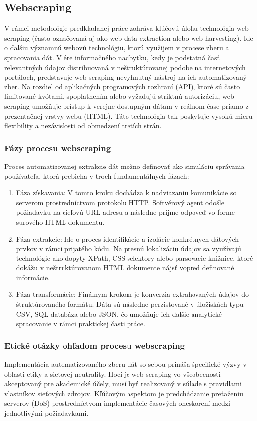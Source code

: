 \subsection{Webscraping}\label{webscraping}
V rámci metodológie predkladanej práce zohráva kľúčovú úlohu technológia web scraping (často označovaná aj ako web data extraction alebo web harvesting). Ide o ďalšiu významnú webovú technológiu, ktorú využijem v procese zberu a spracovania dát. V ére informačného nadbytku, kedy je podstatná časť relevantných údajov distribuovaná v neštruktúrovanej podobe na internetových portáloch, predstavuje web scraping nevyhnutný nástroj na ich automatizovaný zber. Na rozdiel od aplikačných programových rozhraní (API), ktoré sú často limitované kvótami, spoplatnením alebo vyžadujú striktnú autorizáciu, web scraping umožňuje prístup k verejne dostupným dátam v reálnom čase priamo z prezentačnej vrstvy webu (HTML). Táto technológia tak poskytuje vysokú mieru flexibility a nezávislosti od obmedzení tretích strán.

\subsubsection{Fázy procesu webscraping}
Proces automatizovanej extrakcie dát možno definovať ako simuláciu správania používateľa, ktorá prebieha v troch fundamentálnych fázach:
\begin{enumerate}
    \item Fáza získavania: V tomto kroku dochádza k nadviazaniu komunikácie so serverom prostredníctvom protokolu HTTP. Softvérový agent odošle požiadavku na cieľovú URL adresu a následne prijme odpoveď vo forme surového HTML dokumentu.
    \item Fáza extrakcie: Ide o proces identifikácie a izolácie konkrétnych dátových prvkov v rámci prijatého kódu. Na presnú lokalizáciu údajov sa využívajú technológie ako dopyty XPath, CSS selektory alebo parsovacie knižnice, ktoré dokážu v neštruktúrovanom HTML dokumente nájsť vopred definované informácie.
    \item Fáza transformácie: Finálnym krokom je konverzia extrahovaných údajov do štruktúrovaného formátu. Dáta sú následne perzistované v úložiskách typu CSV, SQL databáza alebo JSON, čo umožňuje ich ďalšie analytické spracovanie v rámci praktickej časti práce.
\end{enumerate}

\subsubsection{Etické otázky ohľadom procesu webscraping}
Implementácia automatizovaného zberu dát so sebou prináša špecifické výzvy v oblasti etiky a sieťovej neutrality. Hoci je web scraping vo všeobecnosti akceptovaný pre akademické účely, musí byť realizovaný v súlade s pravidlami vlastníkov sieťových zdrojov. Kľúčovým aspektom je predchádzanie preťaženiu serverov (DoS) prostredníctvom implementácie časových oneskorení medzi jednotlivými požiadavkami.

